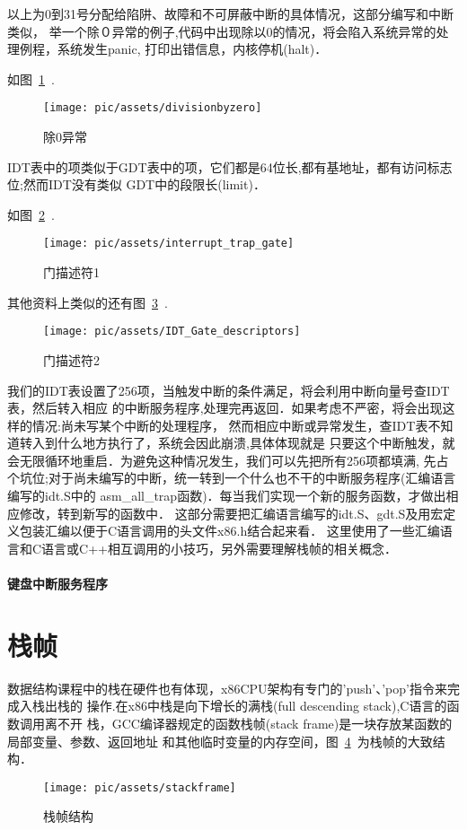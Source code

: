 以上为0到31号分配给陷阱、故障和不可屏蔽中断的具体情况，这部分编写和中断类似，
举一个除０异常的例子,代码中出现除以0的情况，将会陷入系统异常的处理例程，系统发生panic,
打印出错信息，内核停机(halt)．

如图~\ref{divisionbyzero}~.

\begin{figure}[!htbp]
	\centering	\texttt{[image: pic/assets/divisionbyzero]}
    \caption{除0异常}	\label{divisionbyzero}	\end{figure}

IDT表中的项类似于GDT表中的项，它们都是64位长,都有基地址，都有访问标志位;然而IDT没有类似
GDT中的段限长(limit)．

如图~\ref{interrupt_trap_gate}~.

\begin{figure}[!htbp]
	\centering	\texttt{[image: pic/assets/interrupt\_trap\_gate]}
    \caption{门描述符1}	\label{interrupt_trap_gate}	\end{figure}

其他资料上类似的还有图~\ref{IDT_Gate_descriptors}~.
\begin{figure}[!htbp]
        \centering	\texttt{[image: pic/assets/IDT\_Gate\_descriptors]}
        \caption{门描述符2}	\label{IDT_Gate_descriptors}	\end{figure}

我们的IDT表设置了256项，当触发中断的条件满足，将会利用中断向量号查IDT表，然后转入相应
的中断服务程序,处理完再返回．如果考虑不严密，将会出现这样的情况:尚未写某个中断的处理程序，
然而相应中断或异常发生，查IDT表不知道转入到什么地方执行了，系统会因此崩溃,具体体现就是
只要这个中断触发，就会无限循环地重启．为避免这种情况发生，我们可以先把所有256项都填满,
先占个坑位;对于尚未编写的中断，统一转到一个什么也不干的中断服务程序(汇编语言编写的idt.S中的
asm\_all\_trap函数)．每当我们实现一个新的服务函数，才做出相应修改，转到新写的函数中．
这部分需要把汇编语言编写的idt.S、gdt.S及用宏定义包装汇编以便于C语言调用的头文件x86.h结合起来看．
这里使用了一些汇编语言和C语言或C++相互调用的小技巧，另外需要理解栈帧的相关概念．



\paragraph{键盘中断服务程序}

\section{栈帧}
数据结构课程中的栈在硬件也有体现，x86CPU架构有专门的'push'、'pop'指令来完成入栈出栈的
操作.在x86中栈是向下增长的满栈(full descending stack),C语言的函数调用离不开
栈，GCC编译器规定的函数栈帧(stack frame)是一块存放某函数的局部变量、参数、返回地址
和其他临时变量的内存空间，图~\ref{stackframe}~为栈帧的大致结构．
\begin{figure}[!htbp]
    \centering	\texttt{[image: pic/assets/stackframe]}
    \caption{栈帧结构}	\label{stackframe}	\end{figure}

